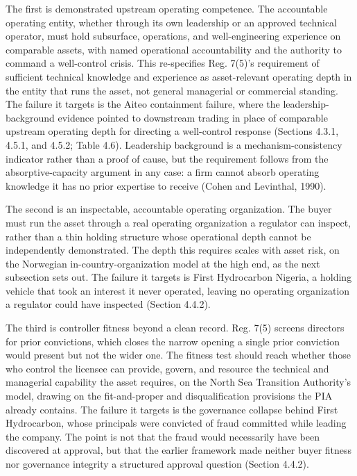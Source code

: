 The first is demonstrated upstream operating competence. The accountable
operating entity, whether through its own leadership or an approved
technical operator, must hold subsurface, operations, and
well-engineering experience on comparable assets, with named operational
accountability and the authority to command a well-control crisis. This
re-specifies Reg. 7(5)'s requirement of sufficient technical knowledge
and experience as asset-relevant operating depth in the entity that runs
the asset, not general managerial or commercial standing. The failure it
targets is the Aiteo containment failure, where the
leadership-background evidence pointed to downstream trading in place of
comparable upstream operating depth for directing a well-control
response (Sections 4.3.1, 4.5.1, and 4.5.2; Table 4.6). Leadership
background is a mechanism-consistency indicator rather than a proof of
cause, but the requirement follows from the absorptive-capacity argument
in any case: a firm cannot absorb operating knowledge it has no prior
expertise to receive (Cohen and Levinthal, 1990).

The second is an inspectable, accountable operating organization. The
buyer must run the asset through a real operating organization a
regulator can inspect, rather than a thin holding structure whose
operational depth cannot be independently demonstrated. The depth this
requires scales with asset risk, on the Norwegian
in-country-organization model at the high end, as the next subsection
sets out. The failure it targets is First Hydrocarbon Nigeria, a holding
vehicle that took an interest it never operated, leaving no operating
organization a regulator could have inspected (Section 4.4.2).

The third is controller fitness beyond a clean record. Reg. 7(5) screens
directors for prior convictions, which closes the narrow opening a
single prior conviction would present but not the wider one. The fitness
test should reach whether those who control the licensee can provide,
govern, and resource the technical and managerial capability the asset
requires, on the North Sea Transition Authority's model, drawing on the
fit-and-proper and disqualification provisions the PIA already contains.
The failure it targets is the governance collapse behind First
Hydrocarbon, whose principals were convicted of fraud committed while
leading the company. The point is not that the fraud would necessarily
have been discovered at approval, but that the earlier framework made
neither buyer fitness nor governance integrity a structured approval
question (Section 4.4.2).

